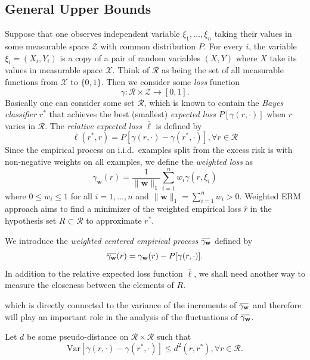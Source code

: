 \documentclass[letterpaper]{article} %
\def\LongVersion{}
\def\LongVersionEnd{}
\newcommand{\Pro}{P}
\newcommand{\Var}{\text{Var}}
\newcommand{\overbar}[1]{\mkern 1.5mu\overline{\mkern-1.5mu#1\mkern-1.5mu}\mkern 1.5mu}
\newcommand*\cen[1]{\overbar{#1}}
\newcommand{\weight}{\mathbf{w}}
\newcommand{\xspace}{\mathcal{X}}
\newcommand{\relossf}{\bar{\ell}}
\newcommand{\cenprocess}[1]{\cen{\gamma_{#1}}}
\newcommand{\normo}[1]{\|#1\|_1}
\begin{document}
\subsection{General Upper Bounds} %
\label{sub:i_i_d_}


Suppose that one observes independent variable $\xi_1,\dots,\xi_n$ taking their values in some measurable space $\mathcal Z$ with common distribution $P$. 
For every $i$, the variable $\xi_i=(X_i,Y_i)$ is a copy of a pair of random variables $(X,Y)$ where $X$ take its values in measurable space $\xspace$. 
Think of $\mathcal{R}$ as being the set of all measurable functions from $\xspace$ to $\{0,1\}$. 
Then we consider some \emph{loss} function
\begin{equation}
    \label{eq:iid_loss}
    \gamma: \mathcal{R} \times \mathcal{Z} \to [0,1].
\end{equation}
Basically one can consider some set $\mathcal{R}$, which is known to contain the \emph{Bayes classifier} $r^*$ that achieves the best (smallest) \emph{expected loss} $P[\gamma(r,\cdot)]$ when $r$ varies in $\mathcal{R}$. The \emph{relative expected loss $\relossf$} is defined by
\begin{equation}
    \label{eq:iid_relative_expected_loss}
    \relossf(r^*,r) = \Pro[\gamma(r,\cdot)-\gamma(r^*,\cdot)], \forall r\in\mathcal{R}
\end{equation}
Since the empirical process on i.i.d.\ examples split from the excess risk is with non-negative weights on all examples, we define the \emph{weighted loss} as
\begin{equation}
    \label{eq:weighted_erm}
    \gamma_\weight(r) = \frac{1}{\normo{\weight{}}}\sum_{i=1}^n w_i\gamma(r,\xi_i)
\end{equation}
where $0\le w_i\le 1$ for all $i=1,\dots,n$ and $\normo{\weight{}}=\sum_{i=1}^n w_i> 0$. Weighted ERM approach aims to find a minimizer of the weighted empirical loss $\hat{r}$ in the hypothesis set $R\subset \mathcal{R}$ to approximate $r^*$.

We introduce the \emph{weighted centered empirical process} $\cenprocess{\weight}$ defined by
\begin{equation}
    \label{eq:centered_empirical_process}
    \cenprocess{\weight}(r) = \gamma_\weight(r)-\Pro[\gamma(r,\cdot)].
\end{equation}
In addition to the relative expected loss function $\relossf$, we shall need another way to measure the closeness between the elements of $R$.
\LongVersion
which is directly connected to the variance of the increments of $\cenprocess{\weight}$ and therefore will play an important role in the analysis of the fluctuations of $\cenprocess{\weight}$.
\LongVersionEnd
Let $d$ be some pseudo-distance on $\mathcal{R}\times\mathcal{R}$ such that
\begin{equation}
    \label{eq:variancD_Eistance_inequality}
    \Var[\gamma(r,\cdot)-\gamma(r^*,\cdot)]\le d^2(r,r^*), \forall r\in\mathcal{R}.
\end{equation}
\end{document}
